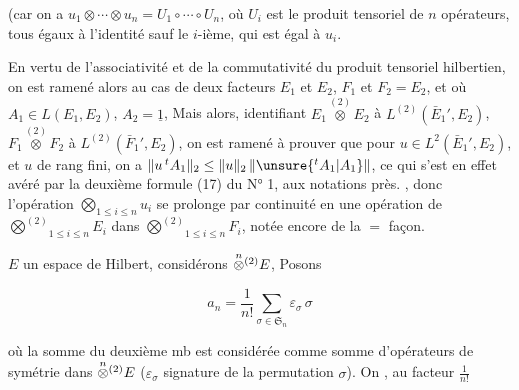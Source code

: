 (car on a $u_1\otimes\cdots\otimes u_n=U_1\circ\cdots\circ U_n$, où $U_i$ est le
produit tensoriel de $n$ opérateurs, tous égaux à l'identité
sauf le $i$-ième, qui est égal à $u_i$. 


En vertu de l'associativité et de la commutativité du
produit tensoriel hilbertien, on  est ramené alors au cas de
deux facteurs $E_1$ et $E_2$, $F_1$ et $F_2=E_2$, et où $A_1\in L(E_1,E_2)$, $A_2=\underline1$,
Mais alors, identifiant $E_1\overset{(2)}{\otimes}E_2$ à $L^{(2)}(\bar E_1',E_2)$, $F_1\overset{(2)}{\otimes}F_2$ à
$L^{(2)}(\bar F_1',E_2)$,  on est ramené
à prouver que pour $u\in L^2(\bar E_1',E_2)$, et $u$ de rang fini,
on a $\|u\,{}^tA_1\|_2\leq\|u\|_2\,\|\unsure{{}^tA_1|A_1}\|$, ce qui s'est en effet
avéré par la  deuxième formule (17) du N° 1,
aux notations près. ,  
donc l'opération $\bigotimes_{1\leq i\leq n}u_i$  se  prolonge
par continuité en une opération de $\overset{(2)}{\bigotimes}_{1\leq i\leq n}E_i$ dans
$\overset{(2)}{\bigotimes}_{1\leq i\leq n}F_i$, notée encore de la $=$ façon. 

 $E$ un espace de Hilbert, considérons
$\overset{n}{\otimes}\vphantom{\otimes}^{(2)}E$,  Posons

\[
a_n=\frac1{n!}\sum_{\sigma\in\mathfrak S_n}\varepsilon_\sigma\,\sigma \tag*{(3)}
\]

où la somme du deuxième mb est considérée comme
somme d'opérateurs de symétrie dans $\overset{n}{\otimes}\vphantom{\otimes}^{(2)}E$ ($\varepsilon_\sigma$ signature
de la permutation $\sigma$).  On , au facteur $\frac1{n!}$

